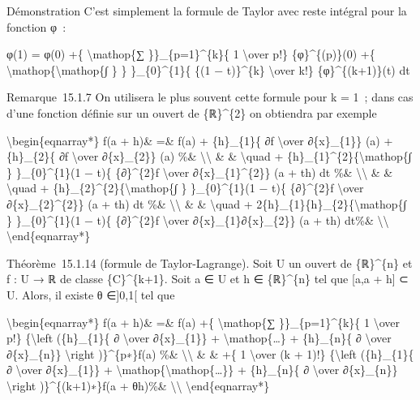 Démonstration C'est simplement la formule de Taylor avec reste intégral
pour la fonction φ~:

φ(1) = φ(0) +\{ \textbackslash{}mathop\{∑ \}\}\_\{p=1\}\^{}\{k\}\{ 1
\textbackslash{}over p!\} \{φ\}\^{}\{(p)\}(0) +\{
\textbackslash{}mathop\{\textbackslash{}mathop\{∫ \} \}
\}\_\{0\}\^{}\{1\}\{ \{(1 − t)\}\^{}\{k\} \textbackslash{}over k!\}
\{φ\}\^{}\{(k+1)\}(t) dt

Remarque~15.1.7 On utilisera le plus souvent cette formule pour k = 1~;
dans cas d'une fonction définie sur un ouvert de \{ℝ\}\^{}\{2\} on
obtiendra par exemple

\textbackslash{}begin\{eqnarray*\} f(a + h)\& =\& f(a) + \{h\}\_\{1\}\{
∂f \textbackslash{}over ∂\{x\}\_\{1\}\} (a) + \{h\}\_\{2\}\{ ∂f
\textbackslash{}over ∂\{x\}\_\{2\}\} (a) \%\&
\textbackslash{}\textbackslash{} \& \& \textbackslash{}quad +
\{h\}\_\{1\}\^{}\{2\}\{\textbackslash{}mathop\{∫ \} \}\_\{0\}\^{}\{1\}(1
− t)\{ \{∂\}\^{}\{2\}f \textbackslash{}over ∂\{x\}\_\{1\}\^{}\{2\}\} (a
+ th) dt \%\& \textbackslash{}\textbackslash{} \& \&
\textbackslash{}quad + \{h\}\_\{2\}\^{}\{2\}\{\textbackslash{}mathop\{∫
\} \}\_\{0\}\^{}\{1\}(1 − t)\{ \{∂\}\^{}\{2\}f \textbackslash{}over
∂\{x\}\_\{2\}\^{}\{2\}\} (a + th) dt \%\&
\textbackslash{}\textbackslash{} \& \& \textbackslash{}quad +
2\{h\}\_\{1\}\{h\}\_\{2\}\{\textbackslash{}mathop\{∫ \}
\}\_\{0\}\^{}\{1\}(1 − t)\{ \{∂\}\^{}\{2\}f \textbackslash{}over
∂\{x\}\_\{1\}∂\{x\}\_\{2\}\} (a + th) dt\%\&
\textbackslash{}\textbackslash{} \textbackslash{}end\{eqnarray*\}

Théorème~15.1.14 (formule de Taylor-Lagrange). Soit U un ouvert de
\{ℝ\}\^{}\{n\} et f : U → ℝ de classe \{C\}\^{}\{k+1\}. Soit a ∈ U et h
∈ \{ℝ\}\^{}\{n\} tel que {[}a,a + h{]} ⊂ U. Alors, il existe θ
∈{]}0,1{[} tel que

\textbackslash{}begin\{eqnarray*\} f(a + h)\& =\& f(a) +\{
\textbackslash{}mathop\{∑ \}\}\_\{p=1\}\^{}\{k\}\{ 1
\textbackslash{}over p!\} \{\textbackslash{}left (\{h\}\_\{1\}\{ ∂
\textbackslash{}over ∂\{x\}\_\{1\}\} +
\textbackslash{}mathop\{\ldots{}\} + \{h\}\_\{n\}\{ ∂
\textbackslash{}over ∂\{x\}\_\{n\}\} \textbackslash{}right
)\}\^{}\{p∗\}f(a) \%\& \textbackslash{}\textbackslash{} \& \& +\{ 1
\textbackslash{}over (k + 1)!\} \{\textbackslash{}left (\{h\}\_\{1\}\{ ∂
\textbackslash{}over ∂\{x\}\_\{1\}\} +
\textbackslash{}mathop\{\textbackslash{}mathop\{\ldots{}\}\} +
\{h\}\_\{n\}\{ ∂ \textbackslash{}over ∂\{x\}\_\{n\}\}
\textbackslash{}right )\}\^{}\{(k+1)∗\}f(a + θh)\%\&
\textbackslash{}\textbackslash{} \textbackslash{}end\{eqnarray*\}

